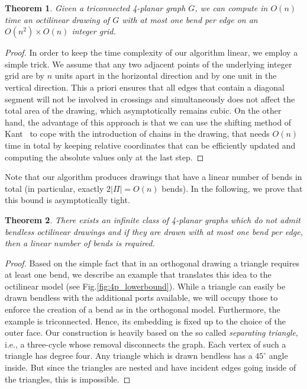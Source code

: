 \documentclass[a4paper,twoside,11pt]{article}
\newtheorem{theorem}{Theorem}
\begin{document}
\begin{theorem}
Given a triconnected 4-planar graph $G$, we can compute in $O(n)$
time an octilinear drawing of $G$ with at most one bend per edge on
an $O(n^2) \times O(n)$ integer grid.
\end{theorem}
\begin{proof}
In order to keep the time complexity of our algorithm linear, we
employ a simple trick. We assume that any two adjacent points of the
underlying integer grid are by $n$ units apart in the horizontal
direction and by one unit in the vertical direction. This a priori
ensures that all edges that contain a diagonal segment will not be
involved in crossings and simultaneously does not affect the total
area of the drawing, which asymptotically remains cubic. On the
other hand, the advantage of this approach is that we can use the
shifting method of Kant~\cite{Kant92b} to cope with the introduction
of chains in the drawing, that needs $O(n)$ time in total by keeping
relative coordinates that can be efficiently updated and computing
the absolute values only at the last step.
\end{proof}

Note that our algorithm produces drawings that have a linear number
of bends in total (in particular, exactly $2|\Pi|=O(n)$ bends). In
the following, we prove that this bound is asymptotically tight.

\begin{theorem}
There exists an infinite class of 4-planar graphs which do not admit
bendless octilinear drawings and if they are drawn with at most one
bend per edge, then a linear number of bends is required.
\end{theorem}
\begin{proof}
Based on the simple fact that in an orthogonal drawing a triangle
requires at least one bend, we describe an example that translates
this idea to the octilinear model (see Fig.\ref{fig:4p_lowerbound}).
While a triangle can easily be drawn bendless with the additional
ports available, we will occupy those to enforce the creation of a
bend as in the orthogonal model. Furthermore, the example is
triconnected. Hence, its embedding is fixed up to the choice of the
outer face. Our construction is heavily based on the so called
\emph{separating triangle}, i.e., a three-cycle whose removal
disconnects the graph. Each vertex of such a triangle has degree
four. Any triangle which is drawn bendless has a $45^\circ$ angle
inside. But since the triangles are nested and have incident edges
going inside of the triangles, this is impossible.
\end{proof}
\end{document}
